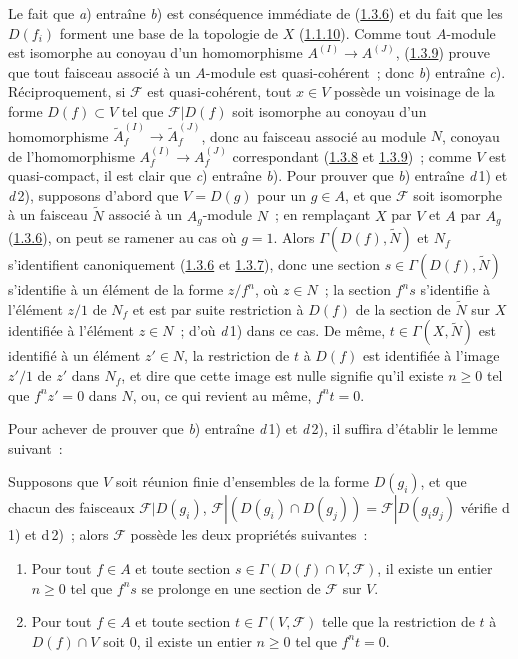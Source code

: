 Le fait que \textit{a}) entraîne \textit{b}) est conséquence immédiate de
(\hyperref[I.1.3.6-fr]{1.3.6}) et du fait que les $D(f_i)$ forment une base
de la topologie de $X$ (\hyperref[I.1.1.10-fr]{1.1.10}). Comme tout
$A$-module est isomorphe au conoyau d'un homomorphisme
$A^{(I)}\to A^{(J)}$, (\hyperref[I.1.3.9-fr]{1.3.9}) prouve que tout faisceau
associé à un $A$-module est quasi-cohérent~; donc \textit{b}) entraîne \textit{c}).
Réciproquement, si $\mathscr{F}$ est quasi-cohérent, tout $x\in V$ possède
un voisinage de la forme $D(f)\subset V$ tel que $\mathscr{F}|D(f)$ soit
isomorphe au conoyau d'un homomorphisme
$\widetilde{A}_f^{(I)}\to\widetilde{A}_f^{(J)}$, donc au faisceau associé au
module $N$, conoyau de l'homomorphisme
$A_f^{(I)}\to A_f^{(J)}$ correspondant
(\hyperref[I.1.3.8-fr]{1.3.8} et \hyperref[I.1.3.9-fr]{1.3.9})~; comme $V$
est quasi-compact, il est clair que \textit{c}) entraîne \textit{b}).
Pour prouver que \textit{b}) entraîne \textit{d}\,1) et \textit{d}\,2),
supposons d'abord que $V=D(g)$ pour un $g\in A$, et que $\mathscr{F}$ soit
isomorphe à un faisceau $\widetilde{N}$ associé à un $A_g$-module $N$~; en
remplaçant $X$ par $V$ et $A$ par $A_g$
(\hyperref[I.1.3.6-fr]{1.3.6}), on peut se ramener au cas où $g=1$. Alors
$\Gamma(D(f),\widetilde{N})$ et $N_f$ s'identifient canoniquement
(\hyperref[I.1.3.6-fr]{1.3.6} et \hyperref[I.1.3.7-fr]{1.3.7}), donc une
section $s\in\Gamma(D(f),\widetilde{N})$ s'identifie à un élément de la
forme $z/f^n$, où $z\in N$~; la section $f^n s$ s'identifie à l'élément
$z/1$ de $N_f$ et est par suite restriction à $D(f)$ de la section de
$\widetilde{N}$ sur $X$ identifiée à l'élément $z\in N$~; d'où
\textit{d}\,1) dans ce cas. De même, $t\in\Gamma(X,\widetilde{N})$ est
identifié à un élément $z'\in N$, la restriction de $t$ à $D(f)$ est
identifiée à l'image $z'/1$ de $z'$ dans $N_f$, et dire que cette image est
nulle signifie qu'il existe $n\geq0$ tel que $f^n z'=0$ dans $N$, ou, ce
qui revient au même, $f^n t=0$.

Pour achever de prouver que \textit{b}) entraîne \textit{d}\,1) et
\textit{d}\,2), il suffira d'établir le lemme suivant~:

\begin{lemma}[1.4.1.1]
\label{I.1.4.1.1-fr}
Supposons que $V$ soit réunion finie d'ensembles de la forme $D(g_i)$, et
que chacun des faisceaux $\mathscr{F}|D(g_i)$,
$\mathscr{F}|(D(g_i)\cap D(g_j))=\mathscr{F}|D(g_i g_j)$ vérifie
\textup{d\,1)} et \textup{d\,2)}~; alors $\mathscr{F}$ possède les deux
propriétés suivantes~:
\begin{enumerate}
  \item[\textup{d'\,1)}] Pour tout $f\in A$ et toute section
  $s\in\Gamma(D(f)\cap V,\mathscr{F})$, il existe un entier $n\geq0$ tel
  que $f^n s$ se prolonge en une section de $\mathscr{F}$ sur $V$.
  \item[\textup{d'\,2)}] Pour tout $f\in A$ et toute section
  $t\in\Gamma(V,\mathscr{F})$ telle que la restriction de $t$ à
  $D(f)\cap V$ soit $0$, il existe un entier $n\geq0$ tel que $f^n t=0$.
\end{enumerate}
\end{lemma}

